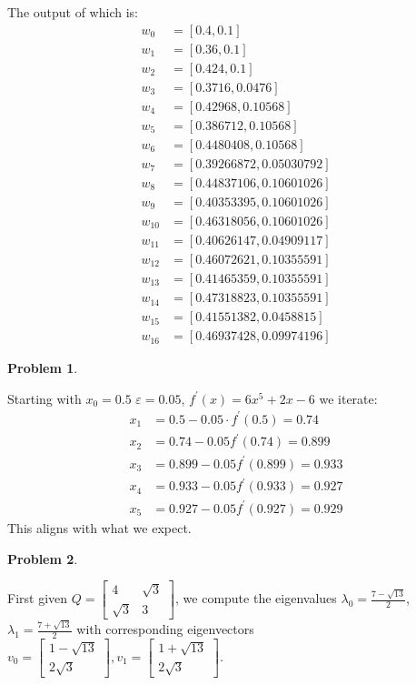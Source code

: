 \documentclass[12pt, a4paper]{article}
\newtheorem{problem}{Problem}
\theoremstyle{definition}
\newcommand{\ep}{\varepsilon}
\newcommand{\bmat}[1]{\begin{bmatrix}#1\end{bmatrix}}
\begin{document}
The output of which is:
\begin{align*}
	w_0 & =[0.4, 0.1]
	\\ w_1 & =[0.36, 0.1 ] 
	\\ w_2 & =[0.424, 0.1  ] 
	\\ w_3 & =[0.3716, 0.0476] 
	\\ w_4 & =[0.42968, 0.10568] 
	\\ w_5 & =[0.386712, 0.10568 ]
	\\ w_6 & =[0.4480408, 0.10568  ] 
	\\ w_7 & =[0.39266872, 0.05030792] 
	\\ w_8 & =[0.44837106, 0.10601026] 
	\\ w_9 & =[0.40353395, 0.10601026] 
	\\ w_{10} & =[0.46318056, 0.10601026] 
	\\ w_{11} & =[0.40626147, 0.04909117] 
	\\ w_{12} & =[0.46072621, 0.10355591]
	\\ w_{13} & =[0.41465359, 0.10355591]
	\\ w_{14} & =[0.47318823, 0.10355591] 
	\\ w_{15} & =[0.41551382, 0.0458815 ] 
	\\ w_{16} & =[0.46937428, 0.09974196]
\end{align*}
\newpage
\begin{problem}
\end{problem}
Starting with $x_0 = 0.5$ $\ep = 0.05$, $f^\prime(x) = 6x^5+2x-6$ we iterate:
\begin{align*}
x_1 & = 0.5  - 0.05\cdot f^\prime(0.5) = 0.74
\\ x_2 & = 0.74 -0.05 f^\prime(0.74 ) = 0.899
\\ x_3 & =0.899 - 0.05 f^\prime(0.899) = 0.933
\\ x_4 & = 0.933 - 0.05 f^\prime(0.933) = 0.927
\\ x_5 & = 0.927 - 0.05 f^\prime(0.927) = 0.929
\end{align*}
This aligns with what we expect. 
\newpage
\begin{problem}
\end{problem}
First given $Q = \bmat{4 & \sqrt{3} \\ \sqrt{3} & 3}$, we compute the eigenvalues $\lambda_0 = \frac{ 7- \sqrt{13} }{ 2 }$, $\lambda_1 = \frac{ 7+\sqrt{13} }{ 2 }$ with corresponding eigenvectors $v_0 = \bmat{ 1- \sqrt{13} \\ 2\sqrt{3}}, v_1 = \bmat{ 1+\sqrt{13}  \\2\sqrt{3 }}$.
\end{document}
